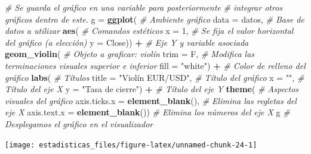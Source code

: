 \documentclass[
  11pt,
]{book}
\newenvironment{Shaded}{\begin{snugshade}}{\end{snugshade}}
\newcommand{\AttributeTok}[1]{\textcolor[rgb]{0.13,0.29,0.53}{#1}}
\newcommand{\CommentTok}[1]{\textcolor[rgb]{0.56,0.35,0.01}{\textit{#1}}}
\newcommand{\DecValTok}[1]{\textcolor[rgb]{0.00,0.00,0.81}{#1}}
\newcommand{\FunctionTok}[1]{\textcolor[rgb]{0.13,0.29,0.53}{\textbf{#1}}}
\newcommand{\NormalTok}[1]{#1}
\newcommand{\OtherTok}[1]{\textcolor[rgb]{0.56,0.35,0.01}{#1}}
\newcommand{\SpecialCharTok}[1]{\textcolor[rgb]{0.81,0.36,0.00}{\textbf{#1}}}
\newcommand{\StringTok}[1]{\textcolor[rgb]{0.31,0.60,0.02}{#1}}
\theoremstyle{definition}
\theoremstyle{definition}
\theoremstyle{definition}
\theoremstyle{definition}
\theoremstyle{remark}
\begin{document}
\begin{Shaded}
\begin{Highlighting}[]
\CommentTok{\# Se guarda el gráfico en una variable para posteriormente}
\CommentTok{\# integrar otros gráficos dentro de este.}
\NormalTok{g }\OtherTok{=} \FunctionTok{ggplot}\NormalTok{( }\CommentTok{\# Ambiente gráfico}
  \AttributeTok{data =}\NormalTok{ datos, }\CommentTok{\# Base de datos a utilizar}
  \FunctionTok{aes}\NormalTok{( }\CommentTok{\# Comandos estéticos}
    \AttributeTok{x =} \DecValTok{1}\NormalTok{, }\CommentTok{\# Se fija el valor horizontal del gráfico (a elección)}
    \AttributeTok{y =}\NormalTok{ Close)) }\SpecialCharTok{+} \CommentTok{\# Eje Y y variable asociada}
  \FunctionTok{geom\_violin}\NormalTok{( }\CommentTok{\# Objeto a graficar: violín}
    \AttributeTok{trim =}\NormalTok{ F, }\CommentTok{\# Modifica las terminaciones visuales superior e inferior}
    \AttributeTok{fill =} \StringTok{"white"}\NormalTok{) }\SpecialCharTok{+} \CommentTok{\# Color de relleno del gráfico}
  \FunctionTok{labs}\NormalTok{( }\CommentTok{\# Títulos}
    \AttributeTok{title =} \StringTok{"Violín EUR/USD"}\NormalTok{, }\CommentTok{\# Título del gráfico}
    \AttributeTok{x =} \StringTok{""}\NormalTok{, }\CommentTok{\# Título del eje X}
    \AttributeTok{y =} \StringTok{"Tasa de cierre"}\NormalTok{) }\SpecialCharTok{+} \CommentTok{\# Título del eje Y}
  \FunctionTok{theme}\NormalTok{( }\CommentTok{\# Aspectos visuales del gráfico}
    \AttributeTok{axis.ticks.x =} \FunctionTok{element\_blank}\NormalTok{(), }\CommentTok{\# Elimina las regletas del eje X}
    \AttributeTok{axis.text.x =} \FunctionTok{element\_blank}\NormalTok{()) }\CommentTok{\# Elimina los números del eje X}
\NormalTok{g }\CommentTok{\# Desplegamos el gráfico en el visualizador}
\end{Highlighting}
\end{Shaded}

\begin{center}\texttt{[image: estadisticas\_files/figure-latex/unnamed-chunk-24-1]} \end{center}
\end{document}
